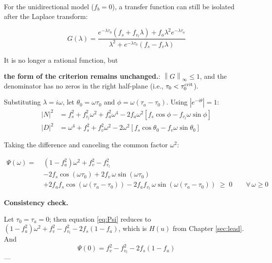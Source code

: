 \documentclass[11pt,a4paper,openany]{book}
\numberwithin{equation}{chapter}
\numberwithin{figure}{chapter}
\numberwithin{table}{chapter}
\begin{document}
For the unidirectional model ($f_b=0$), a transfer function can still be isolated after the Laplace transform:


\begin{tcolorbox}[keybox]
\begin{equation}
G(\lambda) = \frac{e^{-\lambda\tau_0}\left(f_s+f_{v_l}\lambda\right) + f_a\lambda^2 e^{-\lambda\tau_a}}
{\lambda^2 + e^{-\lambda\tau_0}\left(f_s - f_v\lambda\right)}
\end{equation}
\end{tcolorbox}



It is no longer a rational function, but

\textbf{the form of the criterion remains unchanged.}: $\left\|G\right\|_\infty\le1$, and the denominator has no zeros in the right half-plane (i.e., $\tau_0<\tau_0^{\rm crit}$).

Substituting $\lambda=i\omega$, let $\theta_0=\omega\tau_0$ and $\phi=\omega(\tau_a-\tau_0)$. Using $\left|e^{-i\theta}\right|=1$:
\begin{align}
\left|N\right|^2 &= f_s^2+f_{v_l}^2\omega^2 + f_a^2\omega^4
- 2f_a\omega^2\left[f_s\cos\phi - f_{v_l}\omega\sin\phi\right] \\
\left|D\right|^2 &= \omega^4 + f_s^2 + f_v^2\omega^2
- 2\omega^2\left[f_s\cos\theta_0 - f_v\omega\sin\theta_0\right]
\end{align}

Taking the difference and canceling the common factor $\omega^2$:



\begin{tcolorbox}[keybox,title=\textbf{String stability criterion with delay}]
\begin{align}
\Psi(\omega) = \;& \left(1-f_a^2\right)\omega^2 + f_v^2 - f_{v_l}^2 \nonumber\\
& - 2f_s\cos\!\left(\omega\tau_0\right) + 2f_v\,\omega\sin\!\left(\omega\tau_0\right) \nonumber\\
& + 2f_af_s\cos\!\left(\omega(\tau_a{-}\tau_0)\right) - 2f_af_{v_l}\,\omega\sin\!\left(\omega(\tau_a{-}\tau_0)\right)
\;\ge\; 0
\qquad \forall\,\omega\ge0
\label{eq:Psi}
\end{align}
\end{tcolorbox}

\textbf{Consistency check.}

Let $\tau_0=\tau_a=0$; then equation \eqref{eq:Psi} reduces to $(1-f_a^2)\omega^2+f_v^2-f_{v_l}^2-2f_s(1-f_a)$, which is $H(u)$ from Chapter \ref{sec:lead}. And
\begin{equation}
\Psi(0) = f_v^2 - f_{v_l}^2 - 2f_s\left(1-f_a\right)
\end{equation}
—
\end{document}
